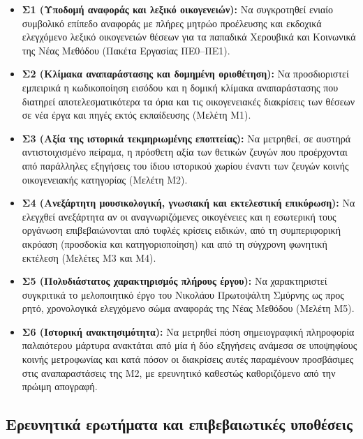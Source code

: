 \documentclass[11pt,a4paper]{article}
\begin{document}
\begin{itemize}
\item
  \textbf{Σ1 (Υποδομή αναφοράς και λεξικό οικογενειών):} Να συγκροτηθεί ενιαίο συμβολικό επίπεδο αναφοράς με πλήρες μητρώο προέλευσης και εκδοχικά ελεγχόμενο λεξικό οικογενειών θέσεων για τα παπαδικά Χερουβικά και Κοινωνικά της Νέας Μεθόδου (Πακέτα Εργασίας ΠΕ0--ΠΕ1).
\item
  \textbf{Σ2 (Κλίμακα αναπαράστασης και δομημένη οριοθέτηση):} Να προσδιοριστεί εμπειρικά η κωδικοποίηση εισόδου και η δομική κλίμακα αναπαράστασης που διατηρεί αποτελεσματικότερα τα όρια και τις οικογενειακές διακρίσεις των θέσεων σε νέα έργα και πηγές εκτός εκπαίδευσης (Μελέτη Μ1).
\item
  \textbf{Σ3 (Αξία της ιστορικά τεκμηριωμένης εποπτείας):} Να μετρηθεί, σε αυστηρά αντιστοιχισμένο πείραμα, η πρόσθετη αξία των θετικών ζευγών που προέρχονται από παράλληλες εξηγήσεις του ίδιου ιστορικού χωρίου έναντι των ζευγών κοινής οικογενειακής κατηγορίας (Μελέτη Μ2).
\item
  \textbf{Σ4 (Ανεξάρτητη μουσικολογική, γνωσιακή και εκτελεστική επικύρωση):} Να ελεγχθεί ανεξάρτητα αν οι αναγνωριζόμενες οικογένειες και η εσωτερική τους οργάνωση επιβεβαιώνονται από τυφλές κρίσεις ειδικών, από τη συμπεριφορική ακρόαση (προσδοκία και κατηγοριοποίηση) και από τη σύγχρονη φωνητική εκτέλεση (Μελέτες Μ3 και Μ4).
\item
  \textbf{Σ5 (Πολυδιάστατος χαρακτηρισμός πλήρους έργου):} Να χαρακτηριστεί συγκριτικά το μελοποιητικό έργο του Νικολάου Πρωτοψάλτη Σμύρνης ως προς ρητό, χρονολογικά ελεγχόμενο σώμα αναφοράς της Νέας Μεθόδου (Μελέτη Μ5).
\item
  \textbf{Σ6 (Ιστορική ανακτησιμότητα):} Να μετρηθεί πόση σημειογραφική πληροφορία παλαιότερου μάρτυρα ανακτάται από μία ή δύο εξηγήσεις ανάμεσα σε υποψηφίους κοινής μετροφωνίας και κατά πόσον οι διακρίσεις αυτές παραμένουν προσβάσιμες στις αναπαραστάσεις της Μ2, με ερευνητικό καθεστώς καθοριζόμενο από την πρώιμη απογραφή.
\end{itemize}

\subsection{Ερευνητικά ερωτήματα και επιβεβαιωτικές υποθέσεις}\label{ux3b5ux3c1ux3b5ux3c5ux3bdux3b7ux3c4ux3b9ux3baux3ac-ux3b5ux3c1ux3c9ux3c4ux3aeux3bcux3b1ux3c4ux3b1-ux3baux3b1ux3b9-ux3b5ux3c0ux3b9ux3b2ux3b5ux3b2ux3b1ux3b9ux3c9ux3c4ux3b9ux3baux3adux3c2-ux3c5ux3c0ux3bfux3b8ux3adux3c3ux3b5ux3b9ux3c2}
\end{document}
